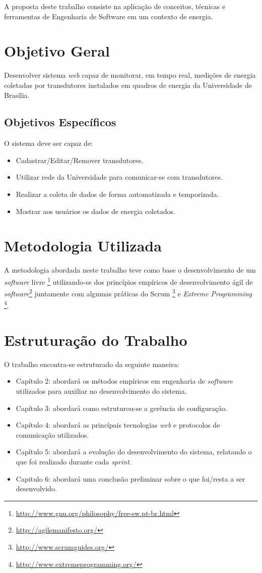 A proposta deste trabalho consiste na aplicação de conceitos, técnicas e ferramentas de Engenharia de Software em um contexto de energia.

\section{Objetivo Geral}
Desenvolver sistema \textit{web} capaz de monitorar, em tempo real, medições de energia coletadas por transdutores
instalados em quadros de energia da Universidade de Brasília.

\subsection{Objetivos Específicos}
O sistema deve ser capaz de:
\begin{itemize}
    \item Cadastrar/Editar/Remover transdutores.
    \item Utilizar rede da Universidade para comunicar-se com transdutores.
    \item Realizar a coleta de dados de forma automatizada e temporizada.
    \item Mostrar aos usuários os dados de energia coletados.
\end{itemize}

\section{Metodologia Utilizada}
A metodologia abordada neste trabalho teve como base o desenvolvimento de um \textit{software} livre \footnote{\url{http://www.gnu.org/philosophy/free-sw.pt-br.html}} utilizando-se dos princípios empíricos de desenvolvimento ágil de \textit{software}\footnote{\url{http://agilemanifesto.org/}} juntamente com algumas práticas do Scrum \footnote{\url{http://www.scrumguides.org/}} e \textit{Extreme Programming} \footnote{\url{http://www.extremeprogramming.org/}}.

\section{Estruturação do Trabalho}
O trabalho encontra-se estruturado da seguinte maneira:

\begin{itemize}
    \item Capítulo 2: abordará os métodos empíricos em engenharia de \textit{software} utilizados para
    auxiliar no desenvolvimento do sistema.
    \item Capítulo 3: abordará como estruturou-se a gerência de configuração.
    \item Capítulo 4: abordará as princípais tecnologias \textit{web} e protocolos de comunicação utilizados.
    \item Capítulo 5: abordará a evolução do desenvolvimento do sistema, relatando o que foi realizado durante cada \textit{sprint}.
    \item Capitulo 6: abordará uma conclusão preliminar sobre o que foi/resta a ser desenvolvido.
\end{itemize}